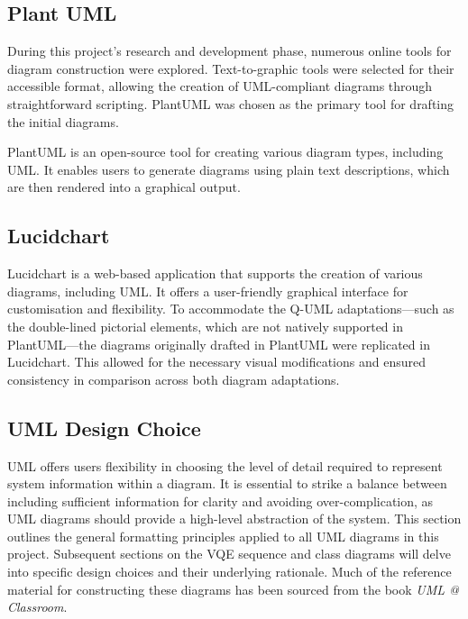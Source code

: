 \documentclass{article}
\begin{document}
\subsection{Plant UML}

During this project's research and development phase, numerous online tools for diagram construction were explored. Text-to-graphic tools were selected for their accessible format, allowing the creation of UML-compliant diagrams through straightforward scripting. PlantUML was chosen as the primary tool for drafting the initial diagrams.

PlantUML is an open-source tool for creating various diagram types, including UML. It enables users to generate diagrams using plain text descriptions, which are then rendered into a graphical output\cite{PUML}\cite{PUMLWIKI}.

\subsection{Lucidchart}

Lucidchart is a web-based application that supports the creation of various diagrams, including UML. It offers a user-friendly graphical interface for customisation and flexibility. To accommodate the Q-UML adaptations—such as the double-lined pictorial elements, which are not natively supported in PlantUML—the diagrams originally drafted in PlantUML were replicated in Lucidchart. This allowed for the necessary visual modifications and ensured consistency in comparison across both diagram adaptations.

\subsection{UML Design Choice}

UML offers users flexibility in choosing the level of detail required to represent system information within a diagram. It is essential to strike a balance between including sufficient information for clarity and avoiding over-complication, as UML diagrams should provide a high-level abstraction of the system. This section outlines the general formatting principles applied to all UML diagrams in this project. Subsequent sections on the VQE sequence and class diagrams will delve into specific design choices and their underlying rationale. Much of the reference material for constructing these diagrams has been sourced from the book \textit{UML @ Classroom}\cite{Seidl_Scholz_Huemer_Kappel_Duffy_2014}. 
\end{document}
